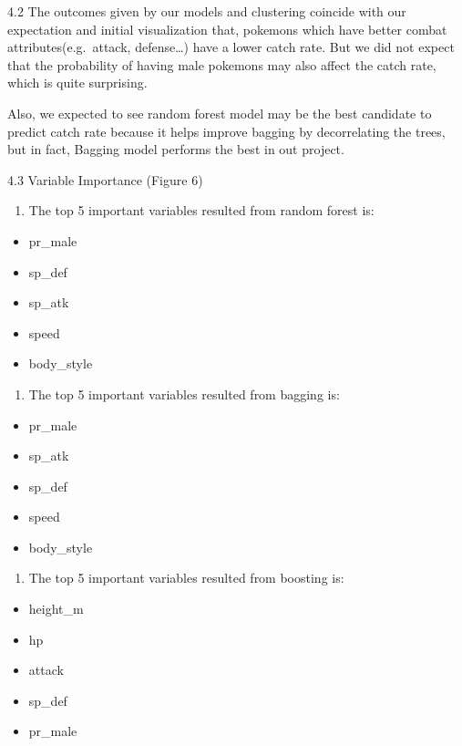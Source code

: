 \documentclass[
]{article}
\providecommand{\tightlist}{%
  \setlength{\itemsep}{0pt}\setlength{\parskip}{0pt}}
\begin{document}
4.2 The outcomes given by our models and clustering coincide with our
expectation and initial visualization that, pokemons which have better
combat attributes(e.g.~attack, defense\ldots) have a lower catch rate.
But we did not expect that the probability of having male pokemons may
also affect the catch rate, which is quite surprising.

Also, we expected to see random forest model may be the best candidate
to predict catch rate because it helps improve bagging by decorrelating
the trees, but in fact, Bagging model performs the best in out project.

4.3 Variable Importance (Figure 6)

\begin{enumerate}
\def\labelenumi{\arabic{enumi}.}
\tightlist
\item
  The top 5 important variables resulted from random forest is:
\end{enumerate}

\begin{itemize}
\tightlist
\item
  pr\_male
\item
  sp\_def
\item
  sp\_atk
\item
  speed
\item
  body\_style
\end{itemize}

\begin{enumerate}
\def\labelenumi{\arabic{enumi}.}
\setcounter{enumi}{1}
\tightlist
\item
  The top 5 important variables resulted from bagging is:
\end{enumerate}

\begin{itemize}
\tightlist
\item
  pr\_male
\item
  sp\_atk
\item
  sp\_def
\item
  speed
\item
  body\_style
\end{itemize}

\begin{enumerate}
\def\labelenumi{\arabic{enumi}.}
\setcounter{enumi}{2}
\tightlist
\item
  The top 5 important variables resulted from boosting is:
\end{enumerate}

\begin{itemize}
\tightlist
\item
  height\_m
\item
  hp
\item
  attack
\item
  sp\_def
\item
  pr\_male
\end{itemize}
\end{document}
